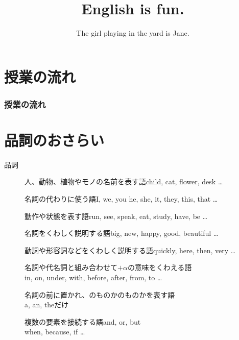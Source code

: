 \documentclass[aspectratio=169,xcolor={dvipsnames,table}]{beamer}
\title{English is fun.}
\subtitle{The girl playing in the yard is Jane.}
\author{}
\institute[]{}
\date[]
\begin{document}
\begin{frame}[plain]
  \titlepage
\end{frame}

\section*{授業の流れ}
\begin{frame}[plain]
  \frametitle{授業の流れ}
  \tableofcontents
\end{frame}

\section{品詞のおさらい}
\begin{frame}[plain,label=basic]{品詞}

  \large
  \begin{description}
    \item[] 人、動物、植物やモノの名前を表す語\hfill{\small child, cat, flower, desk \ldots}

    \item[] 名詞の代わりに使う語\hfill{\small I, we, you he, she, it, they, this, that \ldots}

    \item[] 動作や状態を表す語\hfill{\small run, see, speak, eat, study, have, be \ldots{}}

    \item[] 名詞をくわしく説明する語\hfill{\small big, new, happy, good, beautiful \ldots}

    \item[] 動詞や形容詞などをくわしく説明する語\hfill{\small quickly, here, then, very \ldots}

    \item[] 名詞や代名詞と組み合わせて$+\alpha$の意味をくわえる語\\ \hfill{\small in, on, under, with, before, after, from, to \ldots}

    \item[] 名詞の前に置かれ、のものかのものかを表す語\\
          \hfill{\small a, an, theだけ}

    \item[] 複数の要素を接続する語\hfill{\small and, or, but}\\
          \mbox{}\hfill{\small when, because, if \ldots}
  \end{description}
\end{frame}
\end{document}
